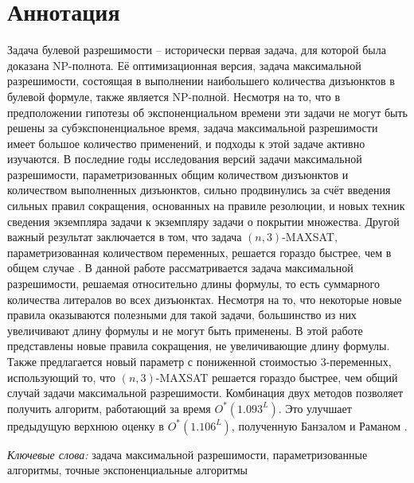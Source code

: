 
\section*{Аннотация}
\label{sec:annotation}

\firstpar{}Задача булевой разрешимости -- исторически первая задача, для которой была доказана NP-полнота. Её оптимизационная версия, задача максимальной разрешимости, состоящая в выполнении наибольшего количества дизъюнктов в булевой формуле, также является NP-полной. Несмотря на то, что в предположении гипотезы об экспоненциальном времени эти задачи не могут быть решены за субэкспоненциальное время, задача максимальной разрешимости имеет большое количество применений, и подходы к этой задаче активно изучаются. В последние годы исследования версий задачи максимальной разрешимости, параметризованных общим количеством дизъюнктов и количеством выполненных дизъюнктов, сильно продвинулись за счёт введения сильных правил сокращения, основанных на правиле резолюции, и новых техник сведения экземпляра задачи к экземпляру задачи о покрытии множества. Другой важный результат заключается в том, что задача $(n,3)$-MAXSAT, параметризованная количеством переменных, решается гораздо быстрее, чем в общем случае \cite{belova18}. В данной работе рассматривается задача максимальной разрешимости, решаемая относительно длины формулы, то есть суммарного количества литералов во всех дизъюнктах. Несмотря на то, что некоторые новые правила оказываются полезными для такой задачи, большинство из них увеличивают длину формулы и не могут быть применены. В этой работе представлены новые правила сокращения, не увеличивающие длину формулы. Также предлагается новый параметр с пониженной стоимостью 3-переменных, использующий то, что $(n,3)$-MAXSAT решается гораздо быстрее, чем общий случай задачи максимальной разрешимости. Комбинация двух методов позволяет получить алгоритм, работающий за время $O^*(1.093^L)$. Это улучшает предыдущую верхнюю оценку в $O^*(1.106^L)$, полученную Банзалом и Раманом \cite{bansal99}.

\vspace{14pt}

\textit{Ключевые слова:} задача максимальной разрешимости, параметризованные алгоритмы, точные экспоненциальные алгоритмы

\newpage

